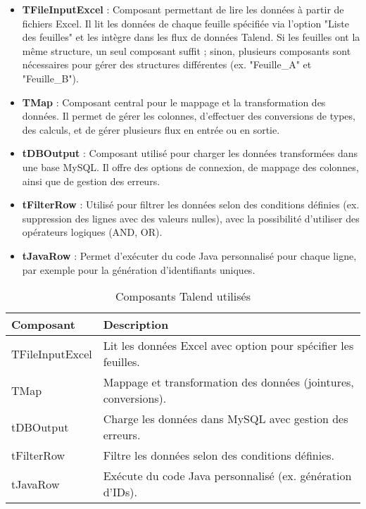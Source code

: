 \begin{itemize}
    \item \textbf{TFileInputExcel} : Composant permettant de lire les données à partir de fichiers Excel. Il lit les données de chaque feuille spécifiée via l’option "Liste des feuilles" et les intègre dans les flux de données Talend. Si les feuilles ont la même structure, un seul composant suffit ; sinon, plusieurs composants sont nécessaires pour gérer des structures différentes (ex. "Feuille\_A" et "Feuille\_B").
    
    \item \textbf{TMap} : Composant central pour le mappage et la transformation des données. Il permet de gérer les colonnes, d’effectuer des conversions de types, des calculs, et de gérer plusieurs flux en entrée ou en sortie.
    
    \item \textbf{tDBOutput} : Composant utilisé pour charger les données transformées dans une base MySQL. Il offre des options de connexion, de mappage des colonnes, ainsi que de gestion des erreurs.
    
    \item \textbf{tFilterRow} : Utilisé pour filtrer les données selon des conditions définies (ex. suppression des lignes avec des valeurs nulles), avec la possibilité d’utiliser des opérateurs logiques (AND, OR).
    
    \item \textbf{tJavaRow} : Permet d’exécuter du code Java personnalisé pour chaque ligne, par exemple pour la génération d’identifiants uniques.
\end{itemize}
\vspace{0.5cm}
\begin{table}[h!]
    \centering
    \begin{tabular}{|l|p{10cm}|}
        \hline
        \textbf{Composant} & \textbf{Description} \\
        \hline
        TFileInputExcel & Lit les données Excel avec option pour spécifier les feuilles. \\
        \hline
        TMap & Mappage et transformation des données (jointures, conversions). \\
        \hline
        tDBOutput & Charge les données dans MySQL avec gestion des erreurs. \\
        \hline
        tFilterRow & Filtre les données selon des conditions définies. \\
        \hline
        tJavaRow & Exécute du code Java personnalisé (ex. génération d'IDs). \\
        \hline
    \end{tabular}
    \caption{Composants Talend utilisés}
    \label{tab:talend_components}
\end{table}


